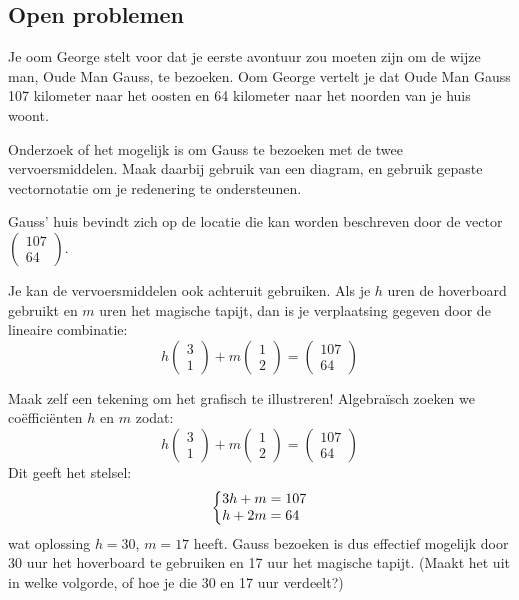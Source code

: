 \documentclass{ximera}
\begin{document}
\subsection*{Open problemen}
\begin{exercise}
Je oom George stelt voor dat je eerste avontuur zou moeten zijn om de wijze man, Oude Man Gauss, te bezoeken.
Oom George vertelt je dat Oude Man Gauss 107 kilometer naar het oosten en 64 kilometer naar het noorden van je huis woont.\newline

Onderzoek of het mogelijk is om Gauss te bezoeken met de twee vervoersmiddelen.
Maak daarbij gebruik van een diagram, en gebruik gepaste vectornotatie om je redenering te ondersteunen.
\begin{hint}
Gauss' huis bevindt zich op de locatie die kan worden beschreven door de vector $\begin{pmatrix} 107 \\ 64 \end{pmatrix}$.
\end{hint}
\begin{hint}
Je kan de vervoersmiddelen ook achteruit gebruiken.
Als je \(h\) uren de hoverboard gebruikt en \(m\) uren het magische tapijt, dan is je verplaatsing gegeven door de lineaire combinatie:
\[h \begin{pmatrix} 3 \\ 1 \end{pmatrix} + m \begin{pmatrix} 1 \\ 2 \end{pmatrix} = \begin{pmatrix} 107 \\ 64 \end{pmatrix}\]
\end{hint}
\begin{oplossing}
Maak zelf een tekening om het grafisch te illustreren!\newline
Algebraïsch zoeken we coëfficiënten \(h\) en \(m\) zodat:
\[h \begin{pmatrix} 3 \\ 1 \end{pmatrix} + m \begin{pmatrix} 1 \\ 2 \end{pmatrix} = \begin{pmatrix} 107 \\ 64 \end{pmatrix}\]
Dit geeft het stelsel:
\[
\left\{
    \begin{array}{@{}l@{}}
    3h+m=107\\
    h+2m=64
    \end{array}
\right.
\]
wat oplossing \(h=30\), \(m=17\) heeft.
Gauss bezoeken is dus effectief mogelijk door 30 uur het hoverboard te gebruiken en 17 uur het magische tapijt.
(Maakt het uit in welke volgorde, of hoe je die 30 en 17 uur verdeelt?)
\end{oplossing}
\end{exercise}
\end{document}

